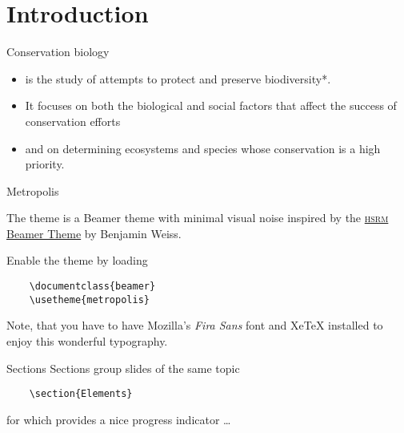 \section{Introduction}
{
	\begin{frame}{Conservation biology}
	\begin{itemize}[<+->]
		\pause
		\item is the study of attempts to protect and preserve \alert{biodiversity}*.
		\item It focuses on both the biological and social factors that affect the success of conservation efforts
		\item and on determining ecosystems and species whose conservation is a high priority.
	\end{itemize}
\end{frame}}


\begin{frame}[fragile]{Metropolis}

  The \themename theme is a Beamer theme with minimal visual noise
  inspired by the \href{https://github.com/hsrmbeamertheme/hsrmbeamertheme}{\textsc{hsrm} Beamer
  Theme} by Benjamin Weiss.

  Enable the theme by loading

  \begin{verbatim}    \documentclass{beamer}
    \usetheme{metropolis}\end{verbatim}

  Note, that you have to have Mozilla's \emph{Fira Sans} font and XeTeX
  installed to enjoy this wonderful typography.
\end{frame}

\begin{frame}[fragile]{Sections}
  Sections group slides of the same topic

  \begin{verbatim}    \section{Elements}\end{verbatim}

  for which \themename provides a nice progress indicator \ldots
\end{frame}